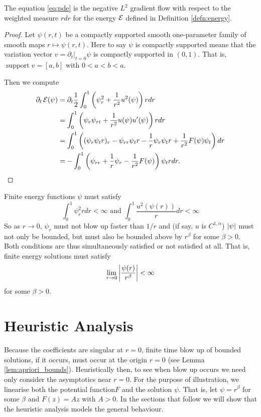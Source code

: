 \documentclass{amsart}
\begin{document}
\begin{lemma}
The equation \eqref{eq:pde} is the negative \(L^2\) gradient flow with respect to the weighted measure \(r dr\) for the energy \(\operatorname{\mathcal{E}}\) defined in Definition \ref{defn:energy}.
\end{lemma}

\begin{proof}
Let \(\psi(r, t)\) be a compactly supported smooth one-parameter family of smooth maps \(r \mapsto \psi(r, t)\). Here to say \(\psi\) is compactly supported means that the variation vector \(v = \partial_t|_{t=0} \psi\) is compactly supported in \((0, 1)\). That is, \(\operatorname{support} v = [a, b]\) with \(0 < a < b < a\).

Then we compute
\[
\begin{split}
\partial_t \operatorname{\mathcal{E}}(\psi) &= \partial_t \frac{1}{2} \int_0^1  \left(\psi_r^2 + \frac{1}{r^2} u^2(\psi)\right) r dr \\
&= \int_0^1  \left(\psi_r \psi_{rt} + \frac{1}{r^2} u(\psi)u'(\psi)\right) r dr \\
&= \int_0^1 \left((\psi_r \psi_t r)_r - \psi_{rr} \psi_t r - \frac{1}{r} \psi_r \psi_t r + \frac{1}{r^2} F(\psi) \psi_t\right) dr \\
&= - \int_0^1 \left(\psi_{rr} + \frac{1}{r} \psi_r - \frac{1}{r^2} F(\psi)\right) \psi_t r dr.
\end{split}
\]
\end{proof}

\begin{rem}
\label{rem:finite_energy}

Finite energy functions \(\psi\) must satisfy
\[
\int_0^1 \psi_r^2 r dr < \infty \text{ and } \int_0^1 \frac{u^2(\psi(r))}{r} dr < \infty
\]
So as \(r\to 0\), \(\psi_r\) must not blow up faster than \(1/r\) and (if say, \(u\) is \(C^{1,\alpha}\)) \(\left|{\psi}\right|\) must not only be bounded, but must also be bounded above by \(r^{\beta}\) for some \(\beta > 0\). Both conditions are thus simultaneously satisfied or not satisfied at all. That is, finite energy solutions must satisfy
\[
\lim_{r \to 0} \left|{\frac{\psi(r)}{r^{\beta}}}\right| < \infty
\]
for some \(\beta > 0\).
\end{rem}

\section{Heuristic Analysis}

Because the coefficients are singular at \(r=0\), finite time blow up of bounded solutions, if it occurs, must occur at the origin \(r = 0\) (see Lemma \ref{lem:apriori_bounds}). Heuristically then, to see when blow up occurs we need only consider the asymptotics near \(r = 0\). For the purpose of illustration, we linearise both the potential function\(F\) and the solution \(\psi\). That is, let \(\psi = r^{\beta}\) for some \(\beta\) and \(F(z) = A z\) with \(A > 0\). In the sections that follow we will show that the heuristic analysis models the general behaviour.
\end{document}
